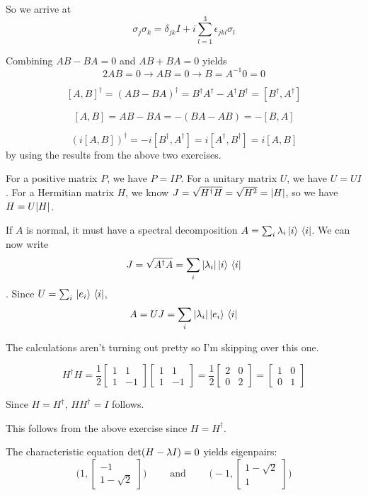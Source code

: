 So we arrive at 
$$\sigma_{j} \sigma_{k} = \delta_{jk} I + i \sum_{l=1}^{3} \epsilon_{jkl} \sigma_{l}$$

\exercise
Combining $AB - BA = 0$ and $AB + BA = 0$ yields
$$2AB = 0 \rightarrow AB = 0 \rightarrow B = A^{-1} 0 = 0$$

\exercise
$$[A, B]^{\dagger} = (AB - BA)^{\dagger} = B^{\dagger} A^{\dagger} - A^{\dagger} B^{\dagger} = [B^{\dagger}, A^{\dagger}]$$

\exercise
$$[A, B] = AB - BA = - (BA - AB) = - [B, A]$$

\exercise
$$( i [A, B])^{\dagger} = -i [B^{\dagger}, A^{\dagger}] = i[A^{\dagger}, B^{\dagger}] = i [A, B]$$
by using the results from the above two exercises. 

\exercise
For a positive matrix $P$, we have $P = IP$. 
For a unitary matrix $U$, we have $U = UI$. 
For a Hermitian matrix $H$, we know $J = \sqrt{H^{\dagger} H} = \sqrt{H^{2}} = \abs{H}$, so we have $H = U \abs{H}$. 

\exercise
If $A$ is normal, it must have a spectral decomposition $A = \sum_{i} \lambda_{i} \ket*{i} \bra*{i}$. We can now write 
$$J = \sqrt{A^{\dagger}A} = \sum_{i} \abs{\lambda_{i}} \ket*{i} \bra*{i}$$. 
Since $U = \sum_{i} \ket*{e_{i}} \bra*{i}$, 
$$A = UJ = \sum_{i} \abs{\lambda_{i}} \ket*{e_{i}} \bra*{i}$$

\exercise
The calculations aren't turning out pretty so I'm skipping over this one. 

\exercise 
$$H^{\dagger} H = \frac{1}{2} \begin{bmatrix}
1 & 1 \\
1 & -1
\end{bmatrix} \begin{bmatrix}
1 & 1 \\
1 & -1
\end{bmatrix} = \frac{1}{2} \begin{bmatrix}
2 & 0 \\
0 & 2
\end{bmatrix} = \begin{bmatrix}
1 & 0 \\
0 & 1
\end{bmatrix}$$

Since $H = H^{\dagger}$, $HH^{\dagger} = I$ follows. 

\exercise
This follows from the above exercise since $H = H^{\dagger}$. 

\exercise
The characteristic equation $\operatorname{det} (H - \lambda I) = 0$ yields eigenpairs: 
$$\Big( 1, \begin{bmatrix}
-1 \\
1 - \sqrt{2}
\end{bmatrix} \Big) \qquad \text{ and } \qquad \Big(-1, \begin{bmatrix}
1 - \sqrt{2} \\
1
\end{bmatrix} \Big)$$

